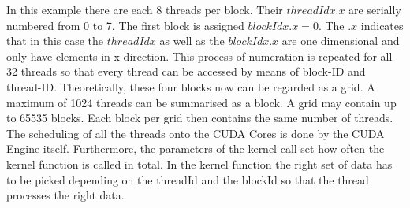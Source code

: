 In this example there are each 8 threads per block. Their $threadIdx.x$ are serially numbered from 0 to 7.
The first block is assigned $blockIdx.x = 0$. The $.x$ indicates that in this case the $threadIdx$ as well as the $blockIdx.x$ are one dimensional and only have elements in x-direction. This process of numeration is repeated for all 32 threads so that every thread can be accessed by means of block-ID and thread-ID. Theoretically, these four blocks now can be  regarded as a grid.
A maximum of 1024 threads can be summarised as a block. A grid may contain up to 65535 blocks. Each block per grid then contains the same number of threads. The scheduling of all the threads onto the CUDA Cores is done by the CUDA Engine itself.
Furthermore, the parameters of the kernel call set how often the kernel function is called in total. In the kernel function the right set of data has to be picked depending on the threadId and the blockId so that the thread processes the right data.

